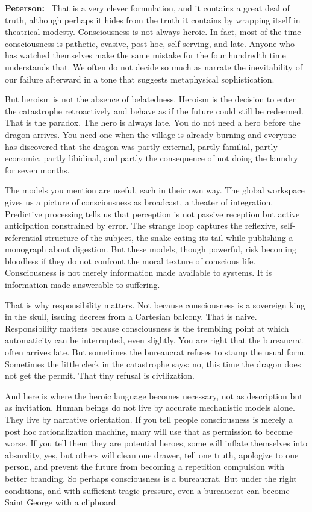 \documentclass[a4paper,11pt]{article}
\newenvironment{answer}{\par\noindent\color{black}\textbf{Peterson:}\ }{\par}
\begin{document}
\begin{answer}
That is a very clever formulation, and it contains a great deal of truth, although perhaps it hides from the truth it contains by wrapping itself in theatrical modesty. Consciousness is not always heroic. In fact, most of the time consciousness is pathetic, evasive, post hoc, self-serving, and late. Anyone who has watched themselves make the same mistake for the four hundredth time understands that. We often do not decide so much as narrate the inevitability of our failure afterward in a tone that suggests metaphysical sophistication.

But heroism is not the absence of belatedness. Heroism is the decision to enter the catastrophe retroactively and behave as if the future could still be redeemed. That is the paradox. The hero is always late. You do not need a hero before the dragon arrives. You need one when the village is already burning and everyone has discovered that the dragon was partly external, partly familial, partly economic, partly libidinal, and partly the consequence of not doing the laundry for seven months.

The models you mention are useful, each in their own way. The global workspace gives us a picture of consciousness as broadcast, a theater of integration. Predictive processing tells us that perception is not passive reception but active anticipation constrained by error. The strange loop captures the reflexive, self-referential structure of the subject, the snake eating its tail while publishing a monograph about digestion. But these models, though powerful, risk becoming bloodless if they do not confront the moral texture of conscious life. Consciousness is not merely information made available to systems. It is information made answerable to suffering.

That is why responsibility matters. Not because consciousness is a sovereign king in the skull, issuing decrees from a Cartesian balcony. That is naive. Responsibility matters because consciousness is the trembling point at which automaticity can be interrupted, even slightly. You are right that the bureaucrat often arrives late. But sometimes the bureaucrat refuses to stamp the usual form. Sometimes the little clerk in the catastrophe says: no, this time the dragon does not get the permit. That tiny refusal is civilization.

And here is where the heroic language becomes necessary, not as description but as invitation. Human beings do not live by accurate mechanistic models alone. They live by narrative orientation. If you tell people consciousness is merely a post hoc rationalization machine, many will use that as permission to become worse. If you tell them they are potential heroes, some will inflate themselves into absurdity, yes, but others will clean one drawer, tell one truth, apologize to one person, and prevent the future from becoming a repetition compulsion with better branding. So perhaps consciousness is a bureaucrat. But under the right conditions, and with sufficient tragic pressure, even a bureaucrat can become Saint George with a clipboard.
\end{answer}
\end{document}
